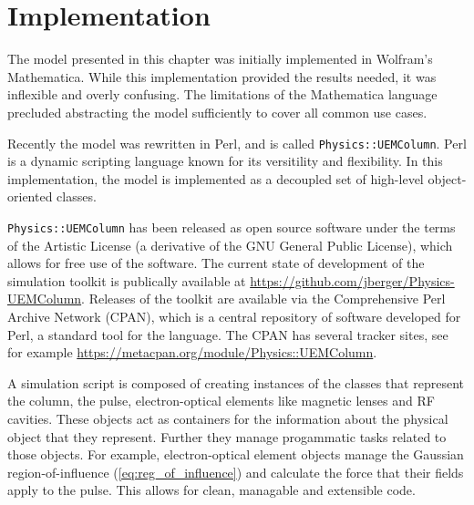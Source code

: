 \section{Implementation}



The model presented in this chapter was initially implemented in Wolfram's Mathematica.
While this implementation provided the results needed, it was inflexible and overly confusing.
The limitations of the Mathematica language precluded abstracting the model sufficiently to cover all common use cases.

Recently the model was rewritten in Perl, and is called \verb!Physics::UEMColumn!.
Perl is a dynamic scripting language known for its versitility and flexibility.
In this implementation, the model is implemented as a decoupled set of high-level object-oriented classes.

\verb!Physics::UEMColumn! has been released as open source software under the terms of the Artistic License (a derivative of the GNU General Public License), which allows for free use of the software.
The current state of development of the simulation toolkit is publically available at \url{https://github.com/jberger/Physics-UEMColumn}.
Releases of the toolkit are available via the Comprehensive Perl Archive Network (CPAN), which is a central repository of software developed for Perl, a standard tool for the language.
The CPAN has several tracker sites, see for example \url{https://metacpan.org/module/Physics::UEMColumn}.

A simulation script is composed of creating instances of the classes that represent the column, the pulse, electron-optical elements like magnetic lenses and RF cavities.
These objects act as containers for the information about the physical object that they represent.
Further they manage progammatic tasks related to those objects.
For example, electron-optical element objects manage the Gaussian region-of-influence (\ref{eq:reg_of_influence}) and calculate the force that their fields apply to the pulse.
This allows for clean, managable and extensible code.


